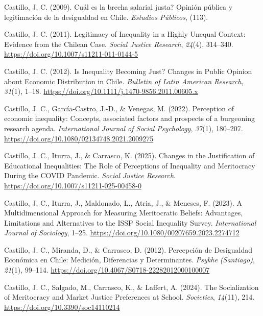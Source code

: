 \documentclass[
  12pt,
]{article}
\newlength{\cslhangindent}
\newenvironment{CSLReferences}[2] %
 {\begin{list}{}{%
  \setlength{\itemindent}{0pt}
  \setlength{\leftmargin}{0pt}
  \setlength{\parsep}{0pt}
  \ifodd #1
   \setlength{\leftmargin}{\cslhangindent}
   \setlength{\itemindent}{-1\cslhangindent}
  \fi
  \setlength{\itemsep}{#2\baselineskip}}}
 {\end{list}}
\begin{document}
\begin{CSLReferences}{1}{0}
Castillo, J. C. (2009). {{\textquestiondown}Cu{á}l es la brecha salarial
justa? Opini{ó}n p{ú}blica y legitimaci{ó}n de la desigualdad en Chile}.
\emph{Estudios P{ú}blicos}, (113).

Castillo, J. C. (2011). Legitimacy of {Inequality} in a {Highly Unequal
Context}: {Evidence} from the {Chilean Case}. \emph{Social Justice
Research}, \emph{24}(4), 314--340.
\url{https://doi.org/10.1007/s11211-011-0144-5}

Castillo, J. C. (2012). Is {Inequality Becoming Just}? {Changes} in
{Public Opinion} about {Economic Distribution} in {Chile}.
\emph{Bulletin of Latin American Research}, \emph{31}(1), 1--18.
\url{https://doi.org/10.1111/j.1470-9856.2011.00605.x}

Castillo, J. C., García-Castro, J.-D., \& Venegas, M. (2022). Perception
of economic inequality: Concepts, associated factors and prospects of a
burgeoning research agenda. \emph{International Journal of Social
Psychology}, \emph{37}(1), 180--207.
\url{https://doi.org/10.1080/02134748.2021.2009275}

Castillo, J. C., Iturra, J., \& Carrasco, K. (2025). Changes in the
{Justification} of {Educational Inequalities}: {The Role} of
{Perceptions} of {Inequality} and {Meritocracy During} the {COVID
Pandemic}. \emph{Social Justice Research}.
\url{https://doi.org/10.1007/s11211-025-00458-0}

Castillo, J. C., Iturra, J., Maldonado, L., Atria, J., \& Meneses, F.
(2023). A {Multidimensional Approach} for {Measuring Meritocratic
Beliefs}: {Advantages}, {Limitations} and {Alternatives} to the {ISSP
Social Inequality Survey}. \emph{International Journal of Sociology},
1--25. \url{https://doi.org/10.1080/00207659.2023.2274712}

Castillo, J. C., Miranda, D., \& Carrasco, D. (2012). Percepci{ó}n de
{Desigualdad Econ{ó}mica} en {Chile}: {Medici{ó}n}, {Diferencias} y
{Determinantes}. \emph{Psykhe (Santiago)}, \emph{21}(1), 99--114.
\url{https://doi.org/10.4067/S0718-22282012000100007}

Castillo, J. C., Salgado, M., Carrasco, K., \& Laffert, A. (2024). The
{Socialization} of {Meritocracy} and {Market Justice Preferences} at
{School}. \emph{Societies}, \emph{14}(11), 214.
\url{https://doi.org/10.3390/soc14110214}


\end{CSLReferences}
\end{document}
